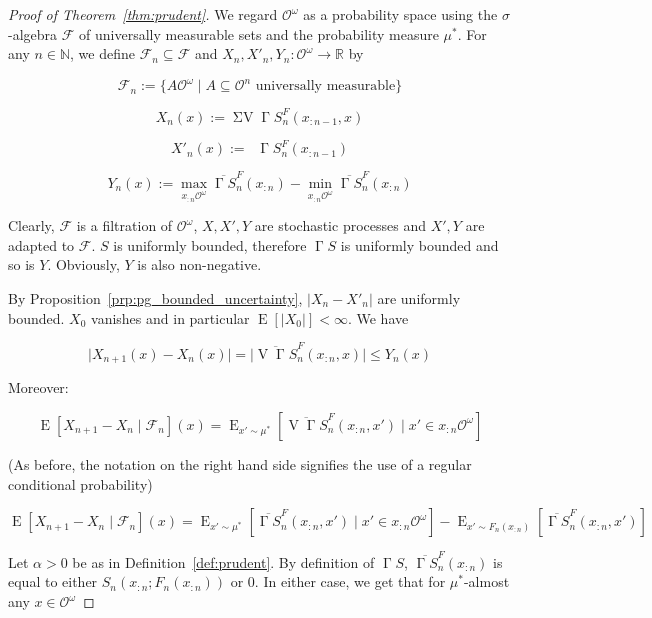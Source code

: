 \documentclass[11pt]{article}
\theoremstyle{definition}
\theoremstyle{plain}
\newcommand{\Nats}{\mathbb{N}}
\newcommand{\Reals}{\mathbb{R}}
\newcommand{\A}[1]{\lvert #1 \rvert}
\DeclareMathOperator{\E}{E}
\newcommand{\Ob}{\mathcal{O}}
\newcommand{\OO}{\Ob^\omega}
\DeclareMathOperator{\V}{V}
\DeclareMathOperator{\SV}{\Sigma V}
\DeclareMathOperator{\SVM}{\Sigma V_{\min}}
\DeclareMathOperator{\PG}{\Gamma}
\newcommand{\F}{\mathcal{F}}
\begin{document}
\begin{proof}[Proof of Theorem~\ref{thm:prudent}]

We regard ${\OO}$ as a probability space using the ${\sigma}$-algebra $\F$ of universally measurable sets and the probability measure ${\mu^*}$. For any ${n \in \Nats}$, we define ${\F_n \subseteq \F}$ and $X_n,X'_n,Y_n: \OO \rightarrow \Reals$ by 

$$\F_n := \{A\Ob^\omega \mid A \subseteq \Ob^n \text{ universally measurable}\}$$

$$X_n\left(x\right):= \SV \PG{S}^F_{n}\left(x_{:n-1},x\right)$$

$$X'_n\left(x\right):= \SVM \PG{S}^F_{n}\left(x_{:n-1}\right)$$

$$Y_n\left(x\right):=\max_{x_{:n}\OO} \overline{\PG{S}}^F_{n}\left(x_{:n}\right) - \min_{x_{:n}\OO} \overline{\PG{S}}^F_{n}\left(x_{:n}\right)$$

Clearly, ${\F}$ is a filtration of ${\OO}$, ${X,X',Y}$ are stochastic processes and ${X',Y}$ are adapted to ${\F}$. ${S}$ is uniformly bounded, therefore ${\PG{S}}$  is uniformly bounded and so is ${Y}$. Obviously, ${Y}$ is also non-negative.

By Proposition~\ref{prp:pg_bounded_uncertainty}, ${\A{X_n-X'_n}}$ are uniformly bounded. ${X_0}$ vanishes and in particular ${\E\left[\A{X_0}\right] < \infty}$. We have

$$\A{X_{n+1}\left(x\right)-X_n\left(x\right)} = \A{\overline{\V{\PG{S}}}_{n}^F\left(x_{:n},x\right)} \leq Y_n\left(x\right)$$

Moreover:

$$\E\left[X_{n+1} - X_n \mid \F_n\right]\left(x\right) = \E_{x' \sim \mu^*}\left[\overline{\V{\PG{S}}}_{n}^F\left(x_{:n},x'\right) \mid x' \in x_{:n}\OO\right]$$

(As before, the notation on the right hand side signifies the use of a regular conditional probability)

$$\E\left[X_{n+1} - X_n \mid \F_n\right]\left(x\right) = \E_{x' \sim \mu^*}\left[\overline{\PG{S}}_{n}^F\left(x_{:n},x'\right) \mid x' \in x_{:n}\OO\right] - \E_{x' \sim F_n\left(x_{:n}\right)}\left[\overline{\PG{S}}_{n}^F\left(x_{:n},x'\right)\right]$$

Let $\alpha > 0$ be as in Definition~\ref{def:prudent}. By definition of $\PG{S}$, $\overline{\PG{S}}_{n}^F\left(x_{:n}\right)$ is equal to either $S_n\left(x_{:n};F_n\left(x_{:n}\right)\right)$ or 0. In either case, we get that for $\mu^*$-almost any $x \in \OO$


\end{proof}
\end{document}
